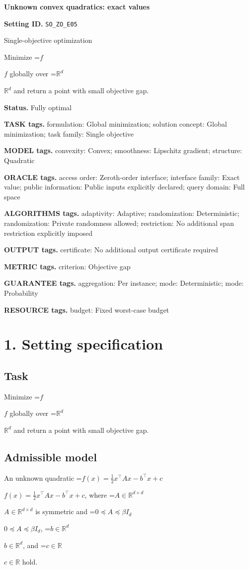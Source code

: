 \documentclass[10pt,a4paper]{article}
\newcommand{\AtlasMath}[1]{\par\begingroup\centering\setbox0=\hbox{$\displaystyle #1$}\ifdim\wd0>1.4\linewidth\typeout{ATLAS WIDE FORMULA: \the\wd0}\fi\ifdim\wd0>\linewidth\resizebox{\linewidth}{!}{\box0}\else\box0\fi\par\endgroup}
\newcommand{\AtlasInlineMath}[1]{\begingroup\setbox0=\hbox{$#1$}\ifdim\wd0>.4\linewidth\endgroup\AtlasMath{#1}\else\endgroup$#1$\fi}
\begin{document}
\raggedright

{\LARGE\bfseries\sffamily\color{AtlasNavy} Unknown convex quadratics: exact values\par}\vspace{5pt}
\textbf{Setting ID.} \texttt{SO\_\allowbreak{}ZO\_\allowbreak{}E05}

Single-objective optimization

Minimize \AtlasInlineMath{f} globally over \AtlasInlineMath{\mathbb{R}^d} and return a point with small objective gap.

\textbf{Status.} Fully optimal

\textbf{TASK tags.} formulation: Global minimization; solution concept: Global minimization; task family: Single objective

\textbf{MODEL tags.} convexity: Convex; smoothness: Lipschitz gradient; structure: Quadratic

\textbf{ORACLE tags.} access order: Zeroth-order interface; interface family: Exact value; public information: Public inputs explicitly declared; query domain: Full space

\textbf{ALGORITHMS tags.} adaptivity: Adaptive; randomization: Deterministic; randomization: Private randomness allowed; restriction: No additional span restriction explicitly imposed

\textbf{OUTPUT tags.} certificate: No additional output certificate required

\textbf{METRIC tags.} criterion: Objective gap

\textbf{GUARANTEE tags.} aggregation: Per instance; mode: Deterministic; mode: Probability

\textbf{RESOURCE tags.} budget: Fixed worst-case budget

\section{1. Setting specification}
\subsection{Task}
Minimize \AtlasInlineMath{f} globally over \AtlasInlineMath{\mathbb{R}^d} and return a point with small objective gap.

\subsection{Admissible model}
An unknown quadratic \AtlasInlineMath{f(x)=\frac12x^\top Ax-b^\top x+c}, where \AtlasInlineMath{A\in\mathbb{R}^{d\times d}} is symmetric and \AtlasInlineMath{0\preceq A\preceq\beta I_d}, \AtlasInlineMath{b\in\mathbb{R}^d}, and \AtlasInlineMath{c\in\mathbb{R}} hold.
\end{document}
